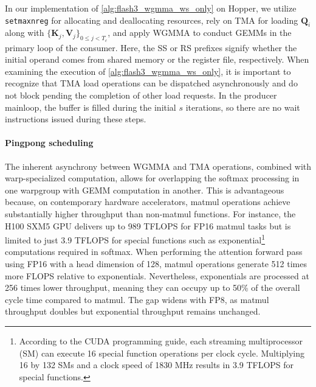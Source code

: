 In our implementation of \cref{alg:flash3_wgmma_ws_only} on Hopper, we utilize \verb|setmaxnreg| for allocating and deallocating resources, rely on TMA for loading $\mathbf{Q}_i$ along with $\{\mathbf{K}_j, \mathbf{V}_j\}_{0 \leq j < T_c}$, and apply WGMMA to conduct GEMMs in the primary loop of the consumer. Here, the SS or RS prefixes signify whether the initial operand comes from shared memory or the register file, respectively. When examining the execution of \cref{alg:flash3_wgmma_ws_only}, it is important to recognize that TMA load operations can be dispatched asynchronously and do not block pending the completion of other load requests. In the producer mainloop, the buffer is filled during the initial $s$ iterations, so there are no wait instructions issued during these steps.

\paragraph{Pingpong scheduling} The inherent asynchrony between WGMMA and TMA operations, combined with warp-specialized computation, allows for overlapping the softmax processing in one warpgroup with GEMM computation in another. This is advantageous because, on contemporary hardware accelerators, matmul operations achieve substantially higher throughput than non-matmul functions. For instance, the H100 SXM5 GPU delivers up to 989 TFLOPS for FP16 matmul tasks but is limited to just 3.9 TFLOPS for special functions such as exponential\footnote{According to the CUDA programming guide, each streaming multiprocessor (SM) can execute 16 special function operations per clock cycle. Multiplying 16 by 132 SMs and a clock speed of 1830 MHz results in 3.9 TFLOPS for special functions.} computations required in softmax. When performing the attention forward pass using FP16 with a head dimension of 128, matmul operations generate 512 times more FLOPS relative to exponentials. Nevertheless, exponentials are processed at 256 times lower throughput, meaning they can occupy up to 50\% of the overall cycle time compared to matmul. The gap widens with FP8, as matmul throughput doubles but exponential throughput remains unchanged.

